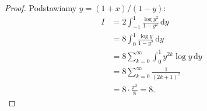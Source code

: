 \begin{proof}
    Podstawiamy $y = (1+x) / (1-y)$:
    \begin{align}
        I & = 2 \int_{-1}^1 \frac{\log y^2}{1-y^2} \,\mathrm{d}y \\
          & = 8 \int_0^1 \frac{\log y}{1-y^2} \, \mathrm{d}{y} \\
          & = 8 \sum_{k=0}^\infty \int_0^1 y^{2k} \log y \,\mathrm{d} y \\
          & = 8 \sum_{k=0}^\infty \frac{1}{(2k+1)^2} \\
          & = 8 \cdot \frac{\pi^2}{8} = 8.
    \end{align}
\end{proof}